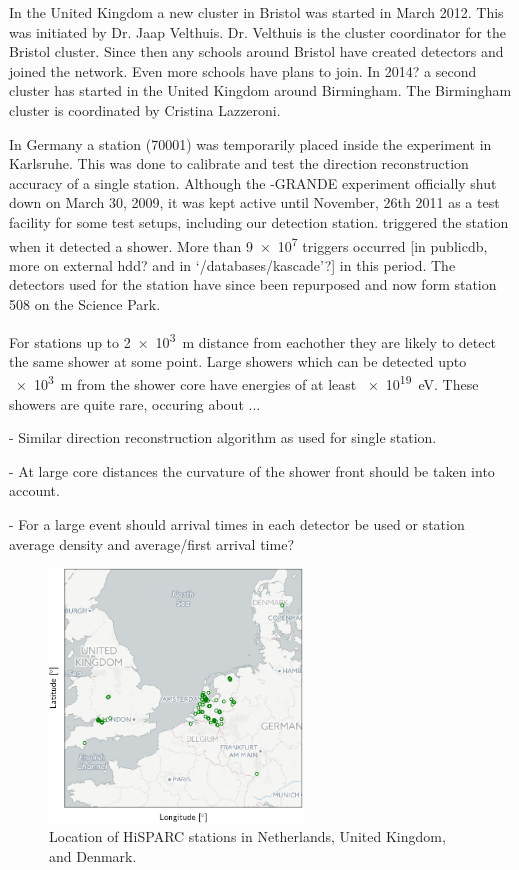 In the United Kingdom a new cluster in Bristol was started in March 2012. This was initiated by Dr. Jaap Velthuis. Dr. Velthuis is the cluster coordinator for the Bristol cluster. Since then any schools around Bristol have created detectors and joined the network. Even more schools have plans to join. In 2014? a second cluster has started in the United Kingdom around Birmingham. The Birmingham cluster is coordinated by Cristina Lazzeroni.

In Germany a station (70001) was temporarily placed inside the \kascade experiment in Karlsruhe. This was done to calibrate and test the direction reconstruction accuracy of a single \hisparc station. Although the \kascade-GRANDE experiment officially shut down on March 30, 2009, it was kept active until November, 26th 2011 as a test facility for some test setups, including our detection station. \kascade triggered the \hisparc station when it detected a shower. More than \num{9e7} triggers occurred [in publicdb, more on external hdd? and in `/databases/kascade'?] in this period. The detectors used for the \kascade station have since been repurposed and now form station 508 on the Science Park.

For stations up to \SI{2e3}{\meter} distance from eachother they are likely to detect the same shower at some point. Large showers which can be detected upto \SI{e3}{\meter} from the shower core have energies of at least \SI{e19}{\eV}. These showers are quite rare, occuring about ...

- Similar direction reconstruction algorithm as used for single station.

- At large core distances the curvature of the shower front should be taken into account.

- For a large event should arrival times in each detector be used or station average density and average/first arrival time?

\begin{figure}
    \centering
    \includegraphics[width=0.6\textwidth]
                    {plots/experiment/network}
    \caption{Location of HiSPARC stations in Netherlands, United Kingdom, and Denmark.}
    \label{fig:network}
\end{figure}


